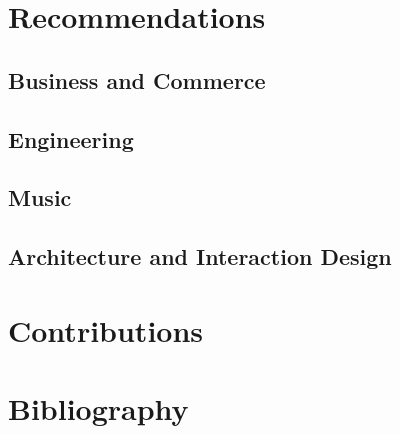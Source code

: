 \documentclass{article}
\begin{document}
\section{Recommendations}
	\subsection{Business and Commerce}
		\pagebreak
	\subsection{Engineering}
		\pagebreak
	\subsection{Music}
		\pagebreak
	\subsection{ Architecture and Interaction Design}
		\pagebreak

\section{Contributions}
	\pagebreak

\section{Bibliography}
	\pagebreak
	
	
\end{document}
